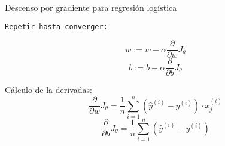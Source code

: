 \documentclass[aspectratio=169,9pt]{beamer}
\begin{document}

\begin{frame}{Descenso por gradiente para regresión logística}

	\texttt{Repetir hasta converger:} \vspace{-6mm}
	\begin{center}
				\begin{equation*}
					w := w  - \alpha \frac{\partial}{\partial w} J_\theta
				\end{equation*}		
				\begin{equation*}
					b := b  - \alpha \frac{\partial}{\partial b}  J_\theta
				\end{equation*}
			\end{center}
			\vspace{8mm}
			Cálculo de la derivadas:
			\begin{equation*}
				\frac{\partial}{\partial w} J_\theta  = \frac{1}{n} \sum_{i=1}^n (\hat{y}^{(i)} - y^{(i)}) \cdot x_j^{(i)}
			\end{equation*}
			\begin{equation*}
				\frac{\partial}{\partial b}  J_\theta = \frac{1}{n} \sum_{i=1}^n (\hat{y}^{(i)} - y^{(i)})
			\end{equation*}
\end{frame}
\end{document}
